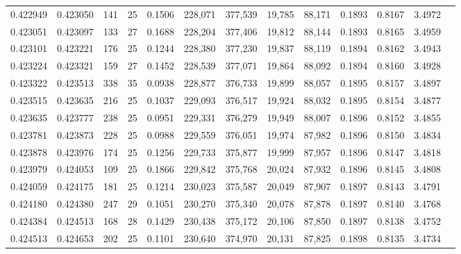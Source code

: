 \begin{tabular}{rrrrrrrrrrrrr}
0.422949 & 0.423050 & 141 &  25 &                                     0.1506 & 228,071 & 377,539 &  19,785 &  88,171 & 0.1893 & 0.8167 & 3.4972 \\
0.423051 & 0.423097 & 133 &  27 &                                     0.1688 & 228,204 & 377,406 &  19,812 &  88,144 & 0.1893 & 0.8165 & 3.4959 \\
0.423101 & 0.423221 & 176 &  25 &                                     0.1244 & 228,380 & 377,230 &  19,837 &  88,119 & 0.1894 & 0.8162 & 3.4943 \\
0.423224 & 0.423321 & 159 &  27 &                                     0.1452 & 228,539 & 377,071 &  19,864 &  88,092 & 0.1894 & 0.8160 & 3.4928 \\
0.423322 & 0.423513 & 338 &  35 &                                     0.0938 & 228,877 & 376,733 &  19,899 &  88,057 & 0.1895 & 0.8157 & 3.4897 \\
0.423515 & 0.423635 & 216 &  25 &                                     0.1037 & 229,093 & 376,517 &  19,924 &  88,032 & 0.1895 & 0.8154 & 3.4877 \\
0.423635 & 0.423777 & 238 &  25 &                                     0.0951 & 229,331 & 376,279 &  19,949 &  88,007 & 0.1896 & 0.8152 & 3.4855 \\
0.423781 & 0.423873 & 228 &  25 &                                     0.0988 & 229,559 & 376,051 &  19,974 &  87,982 & 0.1896 & 0.8150 & 3.4834 \\
0.423878 & 0.423976 & 174 &  25 &                                     0.1256 & 229,733 & 375,877 &  19,999 &  87,957 & 0.1896 & 0.8147 & 3.4818 \\
0.423979 & 0.424053 & 109 &  25 &                                     0.1866 & 229,842 & 375,768 &  20,024 &  87,932 & 0.1896 & 0.8145 & 3.4808 \\
0.424059 & 0.424175 & 181 &  25 &                                     0.1214 & 230,023 & 375,587 &  20,049 &  87,907 & 0.1897 & 0.8143 & 3.4791 \\
0.424180 & 0.424380 & 247 &  29 &                                     0.1051 & 230,270 & 375,340 &  20,078 &  87,878 & 0.1897 & 0.8140 & 3.4768 \\
0.424384 & 0.424513 & 168 &  28 &                                     0.1429 & 230,438 & 375,172 &  20,106 &  87,850 & 0.1897 & 0.8138 & 3.4752 \\
0.424513 & 0.424653 & 202 &  25 &                                     0.1101 & 230,640 & 374,970 &  20,131 &  87,825 & 0.1898 & 0.8135 & 3.4734 \\

\end{tabular}
